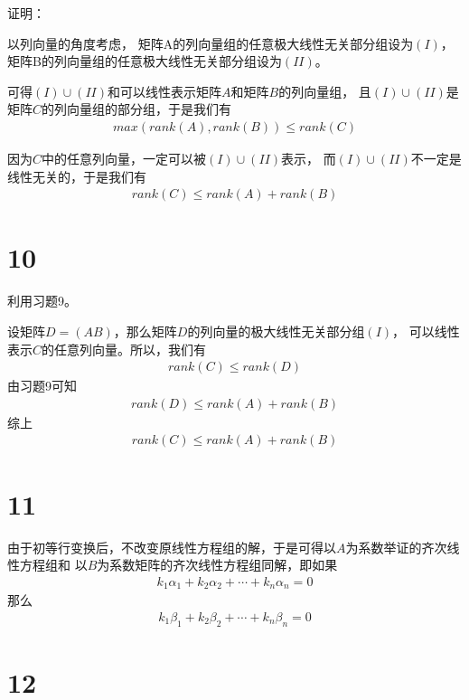 \documentclass{article}
\begin{document}
证明：

以列向量的角度考虑，
矩阵A的列向量组的任意极大线性无关部分组设为$(I)$，
矩阵B的列向量组的任意极大线性无关部分组设为$(II)$。

可得$(I) \cup (II)$和可以线性表示矩阵$A$和矩阵$B$的列向量组，
且$(I) \cup (II)$是矩阵$C$的列向量组的部分组，于是我们有
\begin{align*}
  max(rank(A), rank(B)) \leq rank(C)
\end{align*}

因为$C$中的任意列向量，一定可以被$(I) \cup (II)$表示，
而$(I) \cup (II)$不一定是线性无关的，于是我们有
\begin{align*}
  rank(C) \leq rank(A) + rank(B)
\end{align*}

\section*{10}

利用习题9。

设矩阵$D = (AB)$，那么矩阵$D$的列向量的极大线性无关部分组$(I)$，
可以线性表示$C$的任意列向量。所以，我们有
\begin{align*}
  rank(C) \leq rank(D)
\end{align*}
由习题9可知
\begin{align*}
  rank(D) \leq rank(A) + rank(B)
\end{align*}
综上
\begin{align*}
  rank(C) \leq rank(A) + rank(B)
\end{align*}

\section*{11}

由于初等行变换后，不改变原线性方程组的解，于是可得以$A$为系数举证的齐次线性方程组和
以$B$为系数矩阵的齐次线性方程组同解，即如果
\begin{align}
  k_1 \alpha_1 + k_2 \alpha_2 + \cdots + k_n \alpha_n = 0
\end{align}
那么
\begin{align*}
  k_1 \beta_1 + k_2 \beta_2 + \cdots + k_n \beta_n = 0
\end{align*}

\section*{12}
\end{document}

